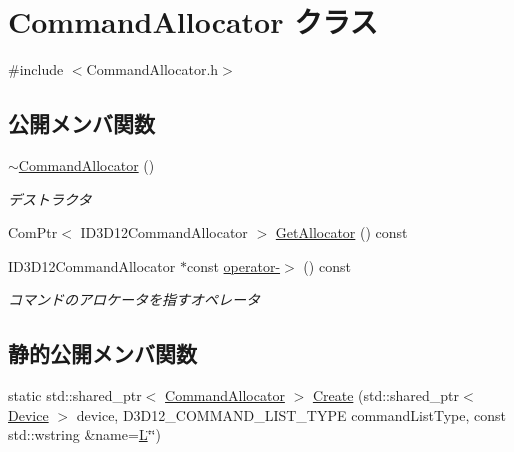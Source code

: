 \hypertarget{class_command_allocator}{}\section{Command\+Allocator クラス}
\label{class_command_allocator}


{\ttfamily \#include $<$Command\+Allocator.\+h$>$}

\subsection*{公開メンバ関数}
\begin{DoxyCompactItemize}
\item 
\mbox{\hyperlink{class_command_allocator_a2c03013b9d9a5147b6d505803252ea7a}{$\sim$\+Command\+Allocator}} ()
\begin{DoxyCompactList}\small\item\em デストラクタ \end{DoxyCompactList}\item 
Com\+Ptr$<$ I\+D3\+D12\+Command\+Allocator $>$ \mbox{\hyperlink{class_command_allocator_a630e54ed6b94bab739c9457e0440a917}{Get\+Allocator}} () const
\item 
I\+D3\+D12\+Command\+Allocator $\ast$const \mbox{\hyperlink{class_command_allocator_a3041e5f33f14ac83dd2bea366c416cdb}{operator-\/$>$}} () const
\begin{DoxyCompactList}\small\item\em コマンドのアロケータを指すオペレータ \end{DoxyCompactList}\end{DoxyCompactItemize}
\subsection*{静的公開メンバ関数}
\begin{DoxyCompactItemize}
\item 
static std\+::shared\+\_\+ptr$<$ \mbox{\hyperlink{class_command_allocator}{Command\+Allocator}} $>$ \mbox{\hyperlink{class_command_allocator_af7c1081a0fc5d36b36f6c99e3fbe8128}{Create}} (std\+::shared\+\_\+ptr$<$ \mbox{\hyperlink{class_device}{Device}} $>$ device, D3\+D12\+\_\+\+C\+O\+M\+M\+A\+N\+D\+\_\+\+L\+I\+S\+T\+\_\+\+T\+Y\+PE command\+List\+Type, const std\+::wstring \&name=\mbox{\hyperlink{_keyboard_8h_a50f7749e42959062d6f7ee3df6a2fd93ad20caec3b48a1eef164cb4ca81ba2587}{L}}\char`\"{}\char`\"{})
\end{DoxyCompactItemize}


